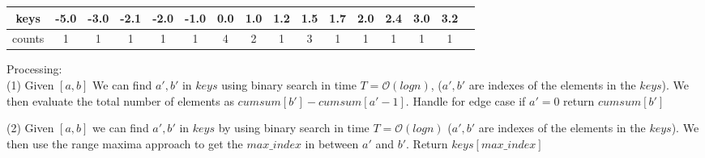 \documentclass[10pt, a4paper]{article}
\newcommand{\BigO}{\mathcal{O}}
\begin{document}
\begin{center}
    \begin{tabular}{ |c||c|c|c|c|c|c|c|c|c|c|c|c|c|c|c| }
     \hline
     keys   & -5.0& -3.0& -2.1& -2.0& -1.0& 0.0& 1.0& 1.2& 1.5& 1.7& 2.0& 2.4& 3.0& 3.2\\
     \hline
     counts & 1& 1& 1& 1& 1& 4& 2& 1& 3& 1& 1& 1& 1& 1\\
     \hline
    \end{tabular}
\end{center}
\normalsize
Processing:\\
(1) Given $[a,b]$ We can find $a',b'$ in $keys$ using binary search in time $T = \BigO(log n)$, ($a', b'$ are indexes of the elements in the $keys$). We then evaluate the total number of elements as $cumsum[b'] - cumsum[a'-1]$. Handle for edge case if $a'=0$ return $cumsum[b']$

(2) Given $[a,b]$ we can find $a',b'$ in $keys$ by using binary search in time $T = \BigO(log n)$ ($a',b'$ are indexes of the elements in the $keys$). We then use the range maxima approach to get the $max\_index$ in between $a'$ and $b'$. Return $keys[max\_index]$
\end{document}
